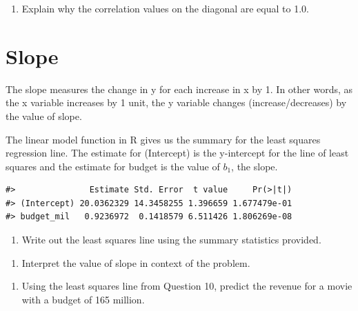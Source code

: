 \documentclass[
]{report}
\providecommand{\tightlist}{%
  \setlength{\itemsep}{0pt}\setlength{\parskip}{0pt}}
\begin{document}
\begin{enumerate}
\def\labelenumi{\arabic{enumi}.}
\setcounter{enumi}{8}
\tightlist
\item
  Explain why the correlation values on the diagonal are equal to 1.0.
\end{enumerate}

\vspace{1in}

\hypertarget{slope}{%
\section{Slope}\label{slope}}

The slope measures the change in y for each increase in x by 1. In other words, as the x variable increases by 1 unit, the y variable changes (increase/decreases) by the value of slope.

The linear model function in R gives us the summary for the least squares regression line. The estimate for (Intercept) is the y-intercept for the line of least squares and the estimate for budget is the value of \(b_1\), the slope.

\begin{verbatim}
#>               Estimate Std. Error  t value     Pr(>|t|)
#> (Intercept) 20.0362329 14.3458255 1.396659 1.677479e-01
#> budget_mil   0.9236972  0.1418579 6.511426 1.806269e-08
\end{verbatim}

\begin{enumerate}
\def\labelenumi{\arabic{enumi}.}
\setcounter{enumi}{9}
\tightlist
\item
  Write out the least squares line using the summary statistics provided.
\end{enumerate}

\vspace{1in}

\begin{enumerate}
\def\labelenumi{\arabic{enumi}.}
\setcounter{enumi}{10}
\tightlist
\item
  Interpret the value of slope in context of the problem.
\end{enumerate}

\vspace{1in}

\begin{enumerate}
\def\labelenumi{\arabic{enumi}.}
\setcounter{enumi}{11}
\tightlist
\item
  Using the least squares line from Question 10, predict the revenue for a movie with a budget of 165 million.
\end{enumerate}
\end{document}
